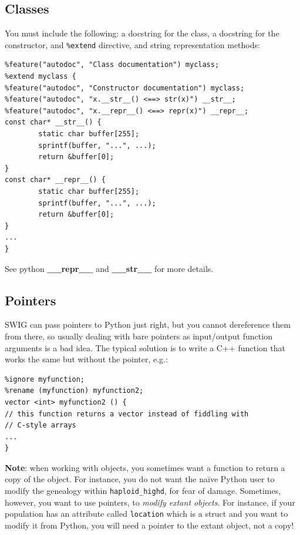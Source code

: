\documentclass[12pt,a4paper,notitlepage,onecolumn]{article}
\begin{document}
\subsection{Classes}
You must include the following: a docstring for the class, a docstring for the
constructor, and \texttt{\%extend} directive, and string representation methods:
\begin{verbatim}
%feature("autodoc", "Class documentation") myclass;
%extend myclass {
%feature("autodoc", "Constructor documentation") myclass;
%feature("autodoc", "x.__str__() <==> str(x)") __str__;
%feature("autodoc", "x.__repr__() <==> repr(x)") __repr__;
const char* __str__() {
        static char buffer[255];
        sprintf(buffer, "...", ...);
        return &buffer[0];
}
const char* __repr__() {
        static char buffer[255];
        sprintf(buffer, "...", ...);
        return &buffer[0];
}
...
}
\end{verbatim}
See python \textbf{\_\_repr\_\_} and \textbf{\_\_str\_\_} for more details.

\subsection{Pointers}
SWIG can pass pointers to Python just right, but you cannot dereference them
from there, so usually dealing with bare pointers as input/output function
arguments is a bad idea. The typical solution is to write a C++ function that
works the same but without the pointer, e.g.:
\begin{verbatim}
%ignore myfunction;
%rename (myfunction) myfunction2;
vector <int> myfunction2 () {
// this function returns a vector instead of fiddling with
// C-style arrays
...
}
\end{verbatim}
\textbf{Note}: when working with objects, you sometimes want a function to
return a copy of the object. For instance, you do not want the na\"ive Python
user to modify the genealogy within \texttt{haploid\_highd}, for fear of damage.
Sometimes, however, you want to use pointers, to \textit{modify extant objects}. For
instance, if your population has an attribute called \texttt{location} which is
a struct and you want to modify it from Python, you will need a pointer to the
extant object, not a copy!
\end{document}
